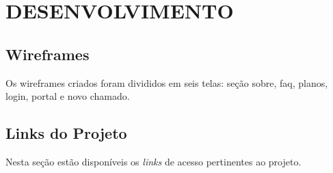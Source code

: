 \chapter{DESENVOLVIMENTO}
	\section{Wireframes}
	Os wireframes criados foram divididos em seis telas: seção sobre, faq, planos, login, portal e novo chamado. 
	    
	
	
	\section{Links do Projeto}
	\newcommand{\urlGithub}{https://github.com/MetaversoIFSP/}
	\newcommand{\urlYoutube}{https://www.youtube.com/channel/UCNXlPi5ADeGx1tZbMo_xOqw/}
	\newcommand{\urlSVN}{https://svn.spo.ifsp.edu.br/viewvc/A6PGP/S202201-PI-NOT/Metaverso/}
	\newcommand{\urlBlog}{https://metaversoifsp.blogspot.com/}
	Nesta seção estão disponíveis os \textit{links} de acesso pertinentes ao projeto.
	
